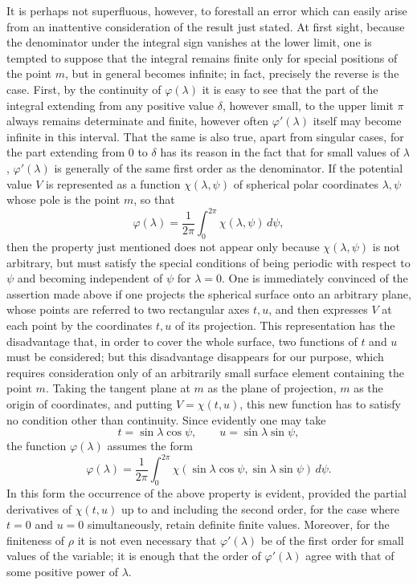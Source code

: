 \documentclass[11pt]{article}
\newcommand{\dd}{\,d}
\begin{document}
It is perhaps not superfluous, however, to forestall an error which can easily arise from an inattentive consideration of the result just stated. At first sight, because the denominator under the integral sign vanishes at the lower limit, one is tempted to suppose that the integral remains finite only for special positions of the point $m$, but in general becomes infinite; in fact, precisely the reverse is the case. First, by the continuity of $\varphi(\lambda)$ it is easy to see that the part of the integral extending from any positive value $\delta$, however small, to the upper limit $\pi$ always remains determinate and finite, however often $\varphi'(\lambda)$ itself may become infinite in this interval. That the same is also true, apart from singular cases, for the part extending from $0$ to $\delta$ has its reason in the fact that for small values of $\lambda$, $\varphi'(\lambda)$ is generally of the same first order as the denominator. If the potential value $V$ is represented as a function $\chi(\lambda,\psi)$ of spherical polar coordinates $\lambda,\psi$ whose pole is the point $m$, so that
\[
 \varphi(\lambda)=\frac1{2\pi}\int_0^{2\pi}\chi(\lambda,\psi)\dd\psi,
\]
then the property just mentioned does not appear only because $\chi(\lambda,\psi)$ is not arbitrary, but must satisfy the special conditions of being periodic with respect to $\psi$ and becoming independent of $\psi$ for $\lambda=0$. One is immediately convinced of the assertion made above if one projects the spherical surface onto an arbitrary plane, whose points are referred to two rectangular axes $t,u$, and then expresses $V$ at each point by the coordinates $t,u$ of its projection. This representation has the disadvantage that, in order to cover the whole surface, two functions of $t$ and $u$ must be considered; but this disadvantage disappears for our purpose, which requires consideration only of an arbitrarily small surface element containing the point $m$. Taking the tangent plane at $m$ as the plane of projection, $m$ as the origin of coordinates, and putting $V=\chi(t,u)$, this new function has to satisfy no condition other than continuity. Since evidently one may take
\[
 t=\sin\lambda\cos\psi,
\qquad
 u=\sin\lambda\sin\psi,
\]
the function $\varphi(\lambda)$ assumes the form
\[
 \varphi(\lambda)=\frac1{2\pi}\int_0^{2\pi}\chi(\sin\lambda\cos\psi,\sin\lambda\sin\psi)\dd\psi.
\]
In this form the occurrence of the above property is evident, provided the partial derivatives of $\chi(t,u)$ up to and including the second order, for the case where $t=0$ and $u=0$ simultaneously, retain definite finite values. Moreover, for the finiteness of $\rho$ it is not even necessary that $\varphi'(\lambda)$ be of the first order for small values of the variable; it is enough that the order of $\varphi'(\lambda)$ agree with that of some positive power of $\lambda$.
\end{document}
